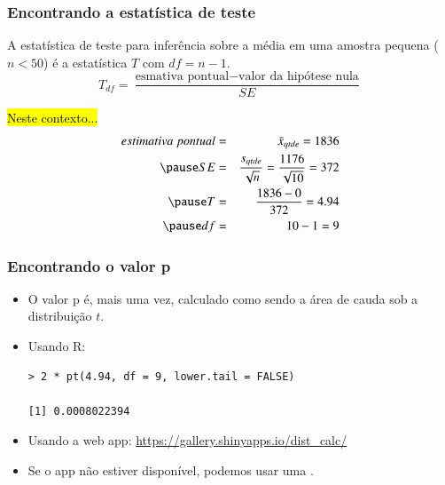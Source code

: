 \begin{frame}
\frametitle{Encontrando a estatística de teste}
\justifying
{}
{A estatística de teste para inferência sobre a média em uma amostra pequena ($ n <50 $) é a estatística $T$ com $df = n - 1$.
\[ T_{df} = \frac{\text{esmativa pontual} - \text{valor da hipótese nula}}{SE} \]}

\pause

\vspace{-0.5cm}
\justifying
\hl{Neste contexto...}
\begin{eqnarray*}
estimativa~pontual &=& \bar{x}_{qtde} = 1836 \\
\pause
SE &=& \frac{s_{qtde}}{\sqrt{n}} = \frac{1176}{\sqrt{10}} = 372 \\
\pause
T &=& \frac{1836 - 0}{372} = 4.94 \\
\pause
df &=& 10 - 1 = 9
\end{eqnarray*}
\justifying
\scriptsize
{}

\end{frame}


\begin{frame}[fragile]
\frametitle{Encontrando o valor p}

\begin{itemize}
\justifying
\item O valor p é, mais uma vez, calculado como sendo a área de cauda sob a distribuição $t$.

\pause

\item Usando R:
\begin{verbatim}
> 2 * pt(4.94, df = 9, lower.tail = FALSE)

[1] 0.0008022394
\end{verbatim}

\pause
\justifying
\item Usando a web app:
\justifying
\href{https://gallery.shinyapps.io/dist_calc/}{\textcolor{oiB}{https://gallery.shinyapps.io/dist\_calc/}}

\pause
\justifying
\item Se o app não estiver disponível, podemos usar uma .

\end{itemize}

\end{frame}

